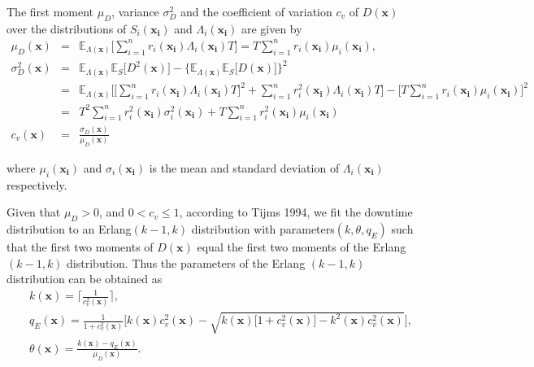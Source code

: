 \documentclass[preprint,12pt]{elsarticle}
\begin{document}
The first moment $\mu_{D}$, variance $\sigma^{2}_{D}$ and the coefficient of variation $c_{v}$  of $D(\boldsymbol{x})$ over the distributions of $S_{i}(\boldsymbol{x_{i}})$ and $\Lambda_{i}(\boldsymbol{x_{i}})$ are given by
\begin{eqnarray}
\mu_{D}(\boldsymbol{x})&=&\mathbb{E}_{\Lambda(\boldsymbol{x})}\bigg[\sum_{i=1}^{n}{r_{i}(\boldsymbol{x_{i}})\Lambda_{i}(\boldsymbol{x_{i}})T}\bigg]=T\sum_{i=1}^{n}{r_{i}(\boldsymbol{x_i})\mu_{i}(\boldsymbol{x_i})},
\label{muD}\\
\sigma^{2}_{D}(\boldsymbol{x})&=&\mathbb{E}_{\Lambda(\boldsymbol{x})}\mathbb{E}_{S} \bigg[D^{2}(\boldsymbol{x}) \bigg]- \bigg\{\mathbb{E}_{\Lambda(\boldsymbol{x})}\mathbb{E}_{S}\bigg[D(\boldsymbol{x}) \bigg] \bigg\}^{2} \nonumber\\
&=& \mathbb{E}_{\Lambda(\boldsymbol{x})}\bigg[\bigg[\sum_{i=1}^{n}{r_{i}(\boldsymbol{x_{i}})\Lambda_{i}(\boldsymbol{x_{i}})T}\bigg]^{2} +\sum_{i=1}^{n}{r_{i}^{2}(\boldsymbol{x_{i}})\Lambda_{i}(\boldsymbol{x_{i}})T}\bigg]-\bigg[T\sum_{i=1}^{n}{r_{i}(\boldsymbol{x_i})\mu_{i}(\boldsymbol{x_i})}\bigg]^{2}\nonumber\\
&=&T^{2}\sum_{i=1}^{n}{r_{i}^{2}(\boldsymbol{x_i})\sigma_{i}^{2}(\boldsymbol{x_i})}+T\sum_{i=1}^{n}{r_{i}^{2}(\boldsymbol{x_i})\mu_{i}(\boldsymbol{x_i})}
\label{sigma}\\
c_{v}(\boldsymbol{x}) &=& \frac{\sigma_{D}(\boldsymbol{x})}{\mu_{D}(\boldsymbol{x})}
\end{eqnarray}

where $\mu_{i}(\boldsymbol{x_i})$ and $\sigma_{i}(\boldsymbol{x_i})$ is the mean and standard deviation of $\Lambda_{i}(\boldsymbol{x_i})$ respectively.


Given that $\mu_{D}>0$, and $0<c_{v}\leq 1$, according to Tijms 1994, we fit the downtime distribution to an Erlang$(k-1,k)$ distribution with parameters$(k,\theta,q_{E})$ such that the first two moments of $D(\boldsymbol{x})$ equal the first two moments of the Erlang $(k-1,k)$ distribution. Thus the parameters of the Erlang $(k-1,k)$ distribution can be obtained as
\begin{eqnarray}
&&k(\boldsymbol{x}) = \lceil \frac{1}{c_{v}^{2}(\boldsymbol{x})} \rceil, \label{k1}\\
&&q_{E}(\boldsymbol{x})= \frac{1}{1+c^{2}_{v}(\boldsymbol{x})}\bigg[k(\boldsymbol{x})c^{2}_{v}(\boldsymbol{x})-\sqrt{k(\boldsymbol{x})\big[1+c^{2}_{v}(\boldsymbol{x})\big]-k^{2}(\boldsymbol{x})c^{2}_{v}(\boldsymbol{x})} \bigg], \label{q1}\\
&&\theta(\boldsymbol{x}) = \frac{k(\boldsymbol{x})-q_{E}(\boldsymbol{x})}{\mu_{D}(\boldsymbol{x})}. \label{theta1}
\end{eqnarray}
\end{document}
